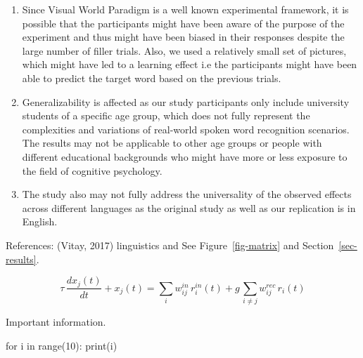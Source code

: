 \documentclass[
  a4paper,
]{article}
\newenvironment{Shaded}{}{}
\newcommand{\BuiltInTok}[1]{\textcolor[rgb]{0.84,0.23,0.29}{#1}}
\newcommand{\ControlFlowTok}[1]{\textcolor[rgb]{0.84,0.23,0.29}{#1}}
\newcommand{\DecValTok}[1]{\textcolor[rgb]{0.00,0.36,0.77}{#1}}
\newcommand{\KeywordTok}[1]{\textcolor[rgb]{0.84,0.23,0.29}{#1}}
\newcommand{\NormalTok}[1]{\textcolor[rgb]{0.14,0.16,0.18}{#1}}
\begin{document}
\begin{enumerate}
\def\labelenumi{\arabic{enumi}.}
\item
  Since Visual World Paradigm is a well known experimental framework, it
  is possible that the participants might have been aware of the purpose
  of the experiment and thus might have been biased in their responses
  despite the large number of filler trials. Also, we used a relatively
  small set of pictures, which might have led to a learning effect i.e
  the participants might have been able to predict the target word based
  on the previous trials.
\item
  Generalizability is affected as our study participants only include
  university students of a specific age group, which does not fully
  represent the complexities and variations of real-world spoken word
  recognition scenarios. The results may not be applicable to other age
  groups or people with different educational backgrounds who might have
  more or less exposure to the field of cognitive psychology.
\item
  The study also may not fully address the universality of the observed
  effects across different languages as the original study as well as
  our replication is in English.
\end{enumerate}

References: (Vitay, 2017) linguistics and See Figure~\ref{fig-matrix}
and Section~\ref{sec-results}.

\[
    \tau \, \frac{dx_j(t)}{dt} + x_j(t)= \sum_i w^{in}_{ij} \, r^{in}_i(t) + g \, \sum_{i \neq j} w^{rec}_{ij} \, r_i(t)
\]

\begin{tcolorbox}[enhanced jigsaw, colback=white, colbacktitle=quarto-callout-note-color!10!white, titlerule=0mm, opacitybacktitle=0.6, left=2mm, toptitle=1mm, leftrule=.75mm, opacityback=0, breakable, bottomrule=.15mm, colframe=quarto-callout-note-color-frame, rightrule=.15mm, coltitle=black, bottomtitle=1mm, toprule=.15mm, title=\textcolor{quarto-callout-note-color}{\faInfo}\hspace{0.5em}{Nota Bene}, arc=.35mm]

Important information.

\end{tcolorbox}

\begin{Shaded}
\begin{Highlighting}[]
\ControlFlowTok{for}\NormalTok{ i }\KeywordTok{in} \BuiltInTok{range}\NormalTok{(}\DecValTok{10}\NormalTok{):}
    \BuiltInTok{print}\NormalTok{(i)}
\end{Highlighting}
\end{Shaded}
\end{document}
